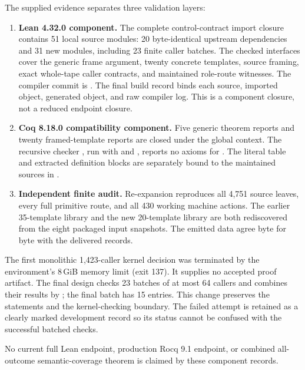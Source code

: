 The supplied evidence separates three validation layers:
\begin{enumerate}
\item \textbf{Lean 4.32.0 component.} The complete control-contract import closure
contains 51 local source modules: 20 byte-identical upstream dependencies and
31 new modules, including 23 finite caller batches. The checked interfaces cover
the generic frame argument, twenty concrete templates, source framing, exact
whole-tape caller contracts, and maintained role-route witnesses. The compiler
commit is . The final build
record binds each source, imported object, generated object, and raw compiler
log. This is a component closure, not a reduced endpoint closure.
\item \textbf{Coq 8.18.0 compatibility component.} Five generic theorem reports
and twenty framed-template reports are closed under the global context.
The recursive checker , run with  and ,
reports no axioms for . The
literal table and extracted definition blocks are separately bound to the
maintained sources in .
\item \textbf{Independent finite audit.} Re-expansion reproduces all 4,751 source
leaves, every full primitive route, and all 430 working machine actions. The
earlier 35-template library and the new 20-template library are both rediscovered
from the eight packaged input snapshots. The emitted data agree byte for byte
with the delivered records.
\end{enumerate}

The first monolithic 1,423-caller kernel decision was terminated by the
environment's 8\,GiB memory limit (exit 137). It supplies no accepted proof
artifact. The final design checks 23 batches of at most 64 callers and combines
their results by ; the final batch has 15 entries. This
change preserves the statements and the kernel-checking boundary. The failed
attempt is retained as a clearly marked development record so its status cannot
be confused with the successful batched checks.

No current full Lean endpoint, production Rocq 9.1 endpoint, or combined
all-outcome semantic-coverage theorem is claimed by these component records.
